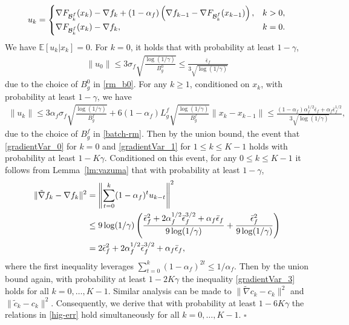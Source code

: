 \documentclass[11pt]{article}
\newenvironment{proof}{{\noindent\it Proof.}\quad}{\hfill $\square$\par}
\begin{document}
\begin{proof}
    \begin{align}  
        u_k = \begin{cases}  
         \nabla F_{\mathcal{B}_k^f}(x_k) - \nabla f_k + (1 - \alpha_f) \left( \nabla f_{k-1} - \nabla F_{\mathcal{B}_k^f}(x_{k-1}) \right), & k > 0, \\ 
         \nabla F_{\mathcal{B}_k^f}(x_k) - \nabla f_k, & k = 0.
        \end{cases}\notag  
    \end{align}  
    We have $\mathbb{E}[u_k | x_k] = 0$. 
    For $k = 0$, it holds that with probability at least $1 - \gamma$,  
    \begin{align}  
        \|u_0\| \leq 3 \sigma_f \sqrt{\frac{\log(1/\gamma)}{B_g^0}} \leq \frac{\bar \epsilon_f}{3\sqrt{ \log(1/\gamma)} }\label{gradientVar_1}  
    \end{align}  
    due to the choice of $B_g^0$ in \eqref{rm_b0}.  
    For any $k \ge 1$, conditioned on $x_k$, with probability at least $1 - \gamma$,  we have
    \begin{align}  
        \|u_k\| \leq 3 \alpha_f \sigma_f \sqrt{\frac{\log(1/\gamma)}{B_g^f}} + 6 (1 - \alpha_f) L_g^f \sqrt{\frac{\log(1/\gamma)}{B_g^f}} \|x_k - x_{k-1}\| \leq \frac{(1 - \alpha_f) \alpha_f^{1/2} \bar \epsilon_f + \alpha_f \bar \epsilon_f^{1/2}}{3\sqrt{ \log(1/\gamma)} },\label{gradientVar_0}  
    \end{align}  
    due to the choice of $B_g^f$ in \eqref{batch-rm}.  
    Then by the union bound, the event that \eqref{gradientVar_0} for $k=0$ and \eqref{gradientVar_1} for $1\le k\le K-1$ holds with probability at least $1 - K \gamma$.  
    Conditioned on this event, for any $0\le k\le K-1$ it follows from  Lemma~\ref{lm:vazuma}   that with probability at least $1 - \gamma$,  
    \begin{align}  
        \|\tilde \nabla f_k - \nabla f_k\|^2 &= \left\| \sum_{t=0}^k (1 - \alpha_f)^t u_{k-t} \right\|^2 \notag \\  
        &\leq 9 \log(1/\gamma) \left( \frac{\bar \epsilon_f^2 + 2 \alpha_f^{1/2} \bar \epsilon_f^{3/2} + \alpha_f \bar \epsilon_f}{9 \log(1/\gamma)} + \frac{\bar \epsilon_f^2}{9\log(1/\gamma)} \right) \notag \\  
        &= 2 \bar \epsilon_f^2 + 2 \alpha_f^{1/2} \bar \epsilon_f^{3/2} + \alpha_f \bar \epsilon_f,\label{gradientVar_3}  
    \end{align}  
    where the first inequality leverages $\sum_{t=0}^k (1 - \alpha_f)^{2t} \leq 1/\alpha_f$.  
    Then  by the union bound again, with probability at least $1 - 2K \gamma$ the inequality   \eqref{gradientVar_3} holds for all $k=0,\ldots,  K-1$.   %
    Similar analysis can be made to $\|\tilde \nabla c_k-c_k\|^2$ and $\|\tilde c_k - c_k\|^2$. Consequently, we derive that with probability at least $1-6K\gamma$ the relations in \eqref{hig-err} hold simultaneously for all $k=0,\ldots,K-1.$%
\end{proof}
\end{document}
